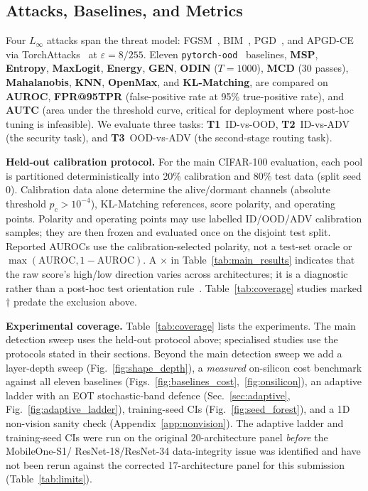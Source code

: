 \documentclass[10pt,letterpaper,journal]{IEEEtran}
\newcommand{\rev}[1]{#1}
\begin{document}
\subsection{Attacks, Baselines, and Metrics}
Four $L_\infty$ attacks span the threat model: FGSM~\cite{goodfellow2014explaining},
BIM~\cite{kurakin2016adversarial}, PGD~\cite{madry2017towards}, and
APGD-CE~\cite{croce2020reliable} via TorchAttacks~\cite{kim2020torchattacks} at
$\varepsilon{=}8/255$. Eleven \texttt{pytorch-ood}~\cite{kirchheim2022pytorch}
baselines, \textbf{MSP}, \textbf{Entropy}, \textbf{MaxLogit}, \textbf{Energy},
\textbf{GEN}, \textbf{ODIN} ($T{=}1000$), \textbf{MCD} (30 passes), \textbf{Mahalanobis},
\textbf{KNN}, \textbf{OpenMax}, and \textbf{KL-Matching}, are compared on
\textbf{AUROC}, \textbf{FPR@95TPR} (false-positive rate at 95\% true-positive rate), and \textbf{AUTC} (area under the threshold curve, critical for deployment where post-hoc tuning is infeasible).
We evaluate three tasks: \textbf{T1}~ID-vs-OOD, \textbf{T2}~ID-vs-ADV (the
security task), and \textbf{T3}~OOD-vs-ADV (the second-stage routing task).

\noindent\textbf{Held-out calibration protocol.} For the main CIFAR-100
evaluation, each pool is partitioned deterministically into 20\% calibration
and 80\% test data (split seed 0). Calibration data alone determine the
alive/dormant channels (absolute threshold $p_c>10^{-4}$), KL-Matching
references, score polarity, and operating points. Polarity and operating points
may use labelled ID/OOD/ADV calibration samples; they are then frozen and
evaluated once on the disjoint test split. Reported AUROCs use the
calibration-selected polarity, not a test-set oracle or
$\max(\mathrm{AUROC},1-\mathrm{AUROC})$. A $\times$ in
Table~\ref{tab:main_results} indicates that the raw score's high/low direction
varies across architectures; it is a diagnostic rather than a post-hoc test
orientation rule~\cite{szyc2023ood}.
Table~\ref{tab:coverage} studies marked $\dagger$ predate the exclusion above.

\rev{\noindent\textbf{Experimental coverage.}
Table~\ref{tab:coverage} lists the experiments. The main detection sweep uses
the held-out protocol above; specialised studies use the protocols stated in
their sections. Beyond the main detection sweep we add a
layer-depth sweep (Fig.~\ref{fig:shape_depth}), a \emph{measured} on-silicon cost
benchmark against all eleven baselines
(Figs.~\ref{fig:baselines_cost},~\ref{fig:onsilicon}), an adaptive
ladder with an EOT stochastic-band defence (Sec.~\ref{sec:adaptive},
Fig.~\ref{fig:adaptive_ladder}), training-seed CIs
(Fig.~\ref{fig:seed_forest}), and a 1D non-vision sanity check
(Appendix~\ref{app:nonvision}). The adaptive ladder and training-seed CIs were
run on the original 20-architecture panel \emph{before} the MobileOne-S1/
ResNet-18/ResNet-34 data-integrity issue was identified and have not been
rerun against the corrected 17-architecture panel for this submission
(Table~\ref{tab:limits}).}
\end{document}
